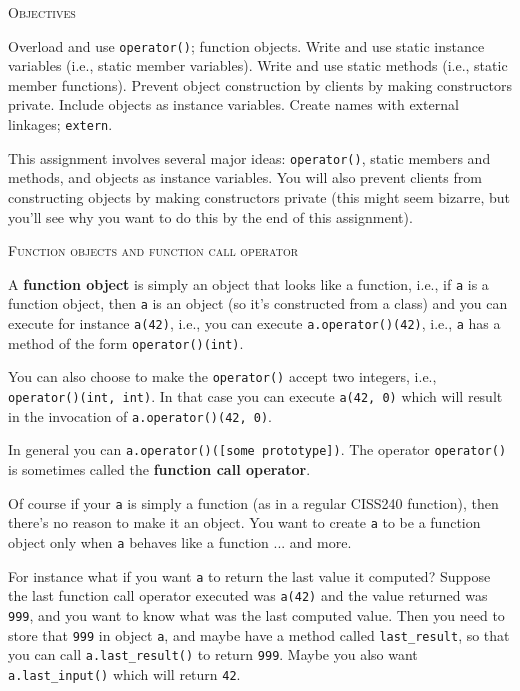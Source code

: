 

\usepackage{fancyvrb}
\newcommand\mybold[1]{\textbf{#1}}


\topmatter

\textsc{Objectives}
  \begin{enumerate}[nosep]
    \li Overload and use \texttt{operator()}; function objects. 
    \li Write and use static instance variables (i.e., static member variables).
    \li Write and use static methods (i.e., static member functions).
    \li Prevent object construction by clients by making constructors private.
    \li Include objects as instance variables.
    \li Create names with external linkages; \verb!extern!.
  \end{enumerate}

This assignment involves several major ideas: \texttt{operator()},
static members and methods, and
objects as instance variables.
You will also prevent clients from constructing objects by
making constructors private (this might seem bizarre, but you'll
see why you want to do this by the end of this assignment).

\newpage
\textsc{Function objects and function call operator}

A \textbf{function object} is simply an object that looks like a function, i.e.,
if \verb!a! is a function object, then \verb!a! is an object
(so it's constructed from a class) and you can execute for instance
\verb!a(42)!, i.e.,
you can execute \verb!a.operator()(42)!, i.e., \verb!a! has a method
of the form \verb!operator()(int)!.

You can also choose to make the \verb!operator()! accept two integers, i.e.,
\verb!operator()(int, int)!.
In that case you can execute \verb!a(42, 0)! which will result in
the invocation of \verb!a.operator()(42, 0)!.

In general you can 
\texttt{a.operator()(\textnormal[some prototype])}.
The operator \verb!operator()! is sometimes called the
\textbf{function call operator}.

Of course if your \verb!a! is simply a function (as in a regular
CISS240 function),
then there's no reason to make it an object.
You want to create \verb!a! to be a function object only when \verb!a!
behaves like a function ... and more.

For instance what if you want \verb!a! to return the last value it computed?
Suppose the last function call operator executed was \verb!a(42)! and the
value returned was \verb!999!, and you want to know what was the last computed
value. Then you need to store that \verb!999! in object \verb!a!,
and maybe have a method called \verb!last_result!, so that
you can call \verb!a.last_result()! to return \verb!999!.
Maybe you also want \verb!a.last_input()! which will return \verb!42!.


